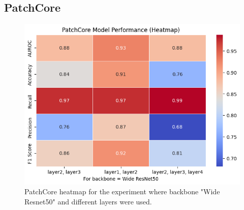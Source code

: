 



\subsection*{PatchCore}

\begin{figure}[ht!]
    \centering
    \includegraphics[width=1\linewidth]{Rohit_Master_Thesis//Images/patchcore heatmap.png}
    \caption{PatchCore heatmap for the experiment where backbone "Wide Resnet50" and different layers were used.}
    \label{fig:patchcore heatmap}
\end{figure}

